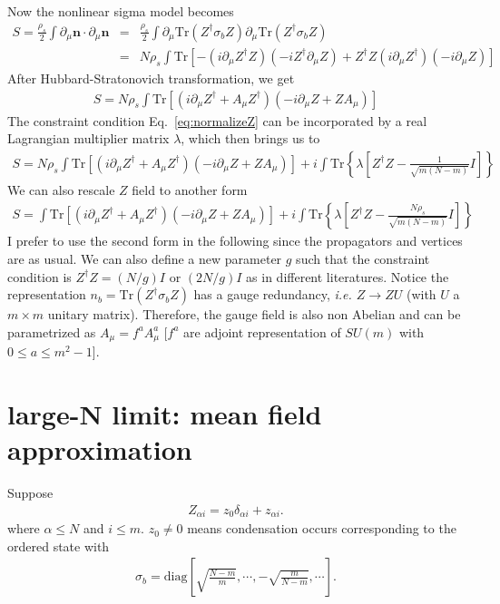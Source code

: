 \documentclass[aps,notitlepage]{revtex4-1}
\newcommand{\bea}{\begin{eqnarray}}
\newcommand{\eea}{\end{eqnarray}}
\newcommand{\bn}{\mathbf{n}}
\newcommand{\ie}{\textit{i.e.{ }}}
\begin{document}
Now the nonlinear sigma model becomes
\bea S=\frac{\rho_s}{2}\int\partial_\mu\bn \cdot \partial_\mu\bn&=&\frac{\rho_s}{2}\int\partial_\mu \mathrm{Tr}(Z^\dagger\sigma_b Z) \partial_\mu \mathrm{Tr}(Z^\dagger \sigma_b Z) \nonumber\\
&=& N\rho_s \int\mathrm{Tr}\left[-(i\partial_\mu Z^\dagger Z) (-iZ^\dag \partial_\mu Z) + Z^\dag Z (i\partial_\mu Z^\dagger)(-i\partial_\mu Z)\right] \eea 
After Hubbard-Stratonovich transformation, we get
\bea S=N\rho_s\int \mathrm{Tr}\left[ (i\partial_\mu Z^\dag+A_\mu Z^\dag)(-i\partial_\mu Z+ZA_\mu)  \right] \eea
The constraint condition Eq.~\eqref{eq:normalizeZ} can be incorporated by a real Lagrangian multiplier matrix $\lambda$, which then brings us to
\bea \boxed{ S=N\rho_s\int \mathrm{Tr}\left[ (i\partial_\mu Z^\dag+A_\mu Z^\dag)(-i\partial_\mu Z+ZA_\mu)  \right] + i\int\mathrm{Tr}\left\{\lambda\left[Z^\dag Z-\frac{1}{\sqrt{m(N-m)}}I\right]\right\} } \eea
We can also rescale $Z$ field to another form
\bea \boxed{ S=\int \mathrm{Tr}\left[ (i\partial_\mu Z^\dag+A_\mu Z^\dag)(-i\partial_\mu Z+ZA_\mu)  \right] + i\int\mathrm{Tr}\left\{\lambda\left[Z^\dag Z-\frac{N\rho_s}{\sqrt{m(N-m)}}I\right]\right\} } \eea
{\color{red} I prefer to use the second form in the following since the propagators and vertices are as usual. We can also define a new parameter $g$ such that the constraint condition is $Z^\dag Z=(N/g)I$ or $(2N/g)I$ as in different literatures.} Notice the representation $n_b=\mathrm{Tr}(Z^\dag \sigma_b Z)$ has a gauge redundancy, \ie $Z\rightarrow ZU$ (with $U$ a $m\times m$ unitary matrix). Therefore, the gauge field is also non Abelian and can be parametrized as $A_\mu=f^aA_\mu^a$ [$f^a$ are adjoint representation of $SU(m)$ with $0\le a\le m^2-1$].



\section{large-N limit: mean field approximation}
Suppose \bea Z_{\alpha i}=z_0\delta_{\alpha i}+z_{\alpha i}. \eea 
where $\alpha\le N$ and $i\le m$. $z_0\ne0$ means condensation occurs corresponding to the ordered state with \bea \sigma_b=\mathrm{diag}\left[\sqrt{\frac{N-m}{m}},\cdots,-\sqrt{\frac{m}{N-m}},\cdots\right]. \eea 
\end{document}
